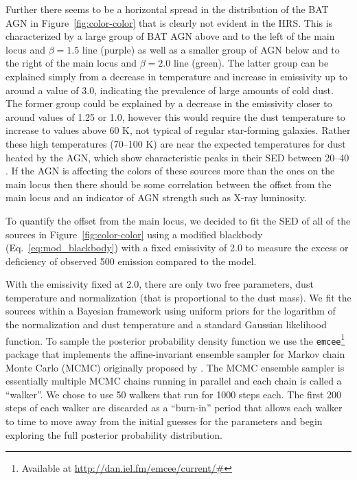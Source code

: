 Further there seems to be a horizontal spread in the distribution of the BAT AGN in Figure~\ref{fig:color-color} that is clearly not evident in the HRS. This is characterized by a large group of BAT AGN above and to the left of the main locus and $\beta=1.5$ line (purple) as well as a smaller group of AGN below and to the right of the main locus and $\beta=2.0$ line (green). The latter group can be explained simply from a decrease in temperature and increase in emissivity up to around a value of 3.0, indicating the prevalence of large amounts of cold dust. The former group could be explained by a decrease in the emissivity closer to around values of 1.25 or 1.0, however this would require the dust temperature to increase to values above 60 K, not typical of regular star-forming galaxies. Rather these high temperatures (70--100 K) are near the expected temperatures for dust heated by the AGN, which show characteristic peaks in their SED between 20--40 \um{} \citep{Richards:2006fj,Netzer:2007ve,Mullaney:2011yq}. If the AGN is affecting the colors of these sources more than the ones on the main locus then there should be some correlation between the offset from the main locus and an indicator of AGN strength such as X-ray luminosity. 

To quantify the offset from the main locus, we decided to fit the SED of all of the sources in Figure~\ref{fig:color-color} using a modified blackbody (Eq.~\ref{eq:mod_blackbody}) with a fixed emissivity of 2.0 to measure the excess or deficiency of observed 500 \um{} emission compared to the model. 

With the emissivity fixed at 2.0, there are only two free parameters, dust temperature and normalization (that is proportional to the dust mass). We fit the sources within a Bayesian framework using uniform priors for the logarithm of the normalization and dust temperature and a standard Gaussian likelihood function. To sample the posterior probability density function we use the \texttt{emcee}\footnote{Available at \url{http://dan.iel.fm/emcee/current/#}} package \citep{Foreman_Mackey_2013} that implements the affine-invariant ensemble sampler for Markov chain Monte Carlo (MCMC) originally proposed by \citet{Goodman_2010}. The MCMC ensemble sampler is essentially multiple MCMC chains running in parallel and each chain is called a ``walker''. We chose to use 50 walkers that run for 1000 steps each. The first 200 steps of each walker are discarded as a ``burn-in'' period that allows each walker to time to move away from the initial guesses for the parameters and begin exploring the full posterior probability distribution.

